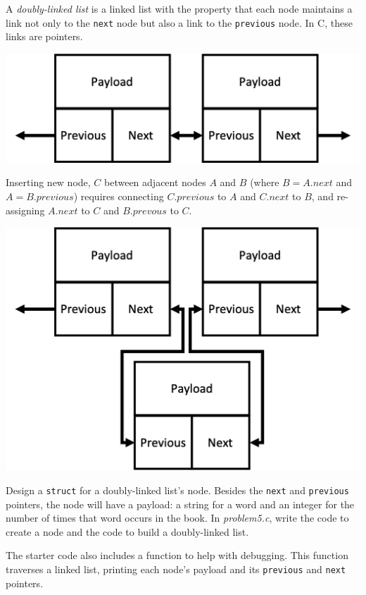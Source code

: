 A \textit{doubly-linked list} is a linked list with the property that each node
maintains a link not only to the \lstinline{next} node but also a link to the
\lstinline{previous} node. In C, these links are pointers.
\begin{center}
\includegraphics[scale=0.5]{doubly-linked-list}
\end{center}
Inserting new node, $C$ between adjacent nodes $A$ and $B$ (where $B = A.next$
and $A = B.previous$) requires connecting $C.previous$ to $A$ and $C.next$ to
$B$, and re-assigning $A.next$ to $C$ and $B.prevous$ to $C$.
\begin{center}
\includegraphics[scale=0.5]{list-insertion}
\end{center}

Design a \lstinline{struct} for a doubly-linked list's node. Besides the
\lstinline{next} and \lstinline{previous} pointers, the node will have a
payload: a string for a word and an integer for the number of times that word
occurs in the book. In \textit{problem5.c}, write the code to create a node
and the code to build a doubly-linked list.

The starter code also includes a  function to help with
debugging. This function traverses a linked list, printing each node's payload
and its \lstinline{previous} and \lstinline{next} pointers.

